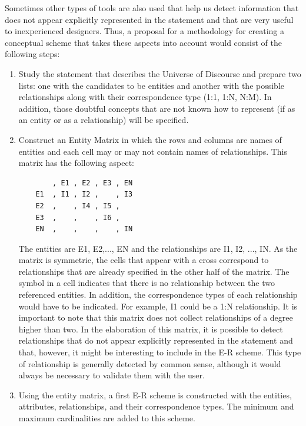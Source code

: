 \documentclass{article}
\begin{document}
Sometimes other types of tools are also used that help us detect information that does not appear explicitly represented in the statement and that are very useful to inexperienced designers.  Thus, a proposal for a methodology for creating a conceptual scheme that takes these aspects into account would consist of the following steps:

\begin{enumerate}
    \item Study the statement that describes the Universe of Discourse and prepare two lists: one with the candidates to be entities and another with the possible relationships along with their correspondence type (1:1, 1:N, N:M).  In addition, those doubtful concepts that are not known how to represent (if as an entity or as a relationship) will be specified.
    \item Construct an Entity Matrix in which the rows and columns are names of entities and each cell may or may not contain names of relationships.  This matrix has the following aspect:

    \begin{verbatim}
        , E1 , E2 , E3 , EN
    E1  , I1 , I2 ,    , I3
    E2  ,    , I4 , I5 ,
    E3  ,    ,    , I6 ,
    EN  ,    ,    ,    , IN
    \end{verbatim}

    The entities are E1, E2,..., EN and the relationships are I1, I2, ..., IN.  As the matrix is symmetric, the cells that appear with a cross correspond to relationships that are already specified in the other half of the matrix.  The symbol in a cell indicates that there is no relationship between the two referenced entities.  In addition, the correspondence types of each relationship would have to be indicated.  For example, I1 could be a 1:N relationship.  It is important to note that this matrix does not collect relationships of a degree higher than two.  In the elaboration of this matrix, it is possible to detect relationships that do not appear explicitly represented in the statement and that, however, it might be interesting to include in the E-R scheme.  This type of relationship is generally detected by common sense, although it would always be necessary to validate them with the user.

    \item Using the entity matrix, a first E-R scheme is constructed with the entities, attributes, relationships, and their correspondence types.  The minimum and maximum cardinalities are added to this scheme.


\end{enumerate}
\end{document}
